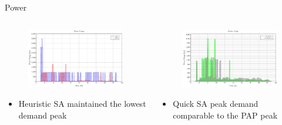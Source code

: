 \documentclass[aspectratio=169]{beamer}
\begin{document}
\begin{frame}[label={sec:orgc9d8f6c}]{Power}
\begin{columns}
\begin{column}{0.5\columnwidth}
\begin{figure}[htpb]
\centering
    \includegraphics[width=\textwidth]{img/sa-pap-paper-good/power-milp-qin}
\end{figure}

\begin{itemize}
\item Heuristic SA maintained the lowest demand peak
\end{itemize}
\end{column}

\begin{column}{0.5\columnwidth}
\begin{figure}[htpb]
\centering
    \includegraphics[width=\textwidth]{img/sa-pap-paper-good/power-sa}
\end{figure}


\begin{itemize}
\item Quick SA peak demand comparable to the PAP peak
\end{itemize}
\end{column}
\end{columns}
\end{frame}
\end{document}
